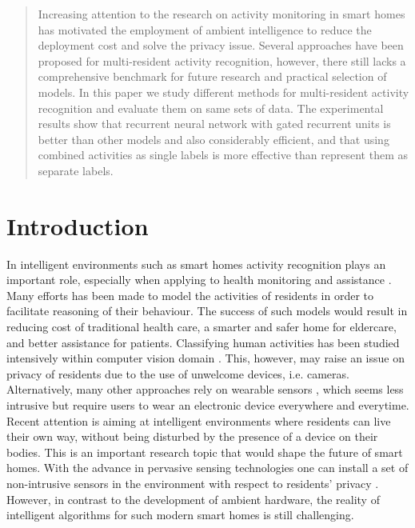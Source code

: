 \date{Received: date / Accepted: date}


\maketitle

\begin{abstract}
  Increasing attention to the research on activity monitoring in smart
homes has motivated the employment of ambient intelligence to reduce
the deployment cost and solve the privacy issue. Several approaches
have been proposed for multi-resident activity recognition, however,
there still lacks a comprehensive benchmark for future research and
practical selection of models. In this paper we study different
methods for multi-resident activity recognition and evaluate them on
same sets of data. The experimental results show that recurrent neural
network with gated recurrent units is better than other models and
also considerably efficient, and that using combined activities as
single labels is more effective than represent them as separate
labels.
\end{abstract}


\section{Introduction}
In intelligent environments such as smart homes activity recognition
plays an important role, especially when applying to health monitoring
and assistance \cite{Das_2004}. Many efforts has been made to model
the activities of residents in order to facilitate reasoning of their
behaviour. The success of such models would result in reducing cost of
traditional health care, a smarter and safer home for eldercare, and
better assistance for patients. Classifying human activities has been
studied intensively within computer vision domain
\cite{Poppe_2010}. This, however, may raise an issue on privacy of
residents due to the use of unwelcome devices,
i.e. cameras. Alternatively, many other approaches rely on wearable
sensors \cite{Plotz_2011}, which seems less intrusive but require
users to wear an electronic device everywhere and everytime.  Recent
attention is aiming at intelligent environments where residents can
live their own way, without being disturbed by the presence of a
device on their bodies. This is an important research topic that would
shape the future of smart homes. With the advance in pervasive sensing
technologies one can install a set of non-intrusive sensors in the
environment with respect to residents' privacy
\cite{Wilson_2005,Singla_2010}. However, in contrast to the
development of ambient hardware, the reality of intelligent algorithms
for such modern smart homes is still challenging.

